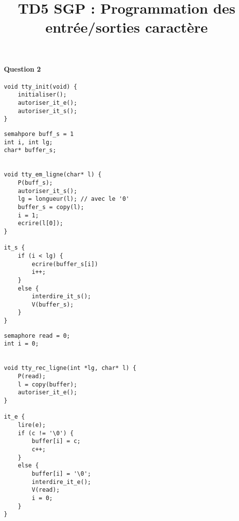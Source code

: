 \documentclass[a4paper,french,11pt]{article}
\title{TD5 SGP : Programmation des entrée/sorties caractère}
\begin{document}
\maketitle

\paragraph{Question 2}

\begin{lstlisting}
void tty_init(void) {
    initialiser();
    autoriser_it_e();
    autoriser_it_s();
}
\end{lstlisting}

\begin{lstlisting}
semahpore buff_s = 1
int i, int lg;
char* buffer_s;


void tty_em_ligne(char* l) {
    P(buff_s);
    autoriser_it_s();
    lg = longueur(l); // avec le '0'
    buffer_s = copy(l);
    i = 1;
    ecrire(l[0]);
}

it_s {
    if (i < lg) {
        ecrire(buffer_s[i])
        i++;
    }
    else {
        interdire_it_s();
        V(buffer_s);
    }
}
\end{lstlisting}

\begin{lstlisting}
semaphore read = 0;
int i = 0;


void tty_rec_ligne(int *lg, char* l) {
    P(read);
    l = copy(buffer);
    autoriser_it_e();
}

it_e {
    lire(e);
    if (c != '\0') {
        buffer[i] = c;
        c++;
    }
    else {
        buffer[i] = '\0';
        interdire_it_e();
        V(read);
        i = 0;
    }
}
\end{lstlisting}
\end{document}

